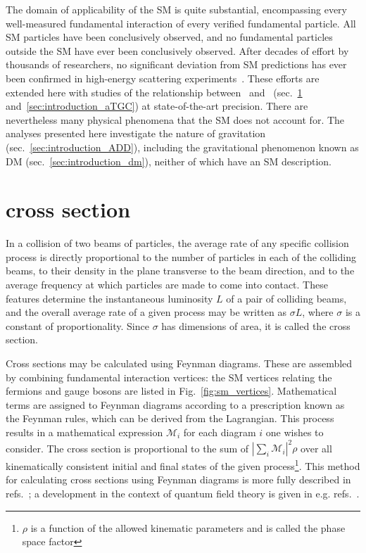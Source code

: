 \documentclass[oneside, letterpaper, 12pt, oldfontcommands]{memoir}
\begin{document}
The domain of applicability of the SM is quite substantial, encompassing
every well-measured fundamental interaction of every verified fundamental particle. All SM particles have been conclusively observed,
and no fundamental particles outside the SM have ever been conclusively observed. After decades of effort by thousands of researchers,
no significant deviation from SM predictions has ever been confirmed in high-energy scattering experiments~\cite{ref:PDG}.
These efforts are extended here with studies of the relationship between \PZ\ and \Pgamma\ (sec.~\ref{sec:introduction_znng} and~\ref{sec:introduction_aTGC}) at state-of-the-art precision.
There are nevertheless many physical phenomena that the SM does not account for.
The analyses presented here investigate the nature of gravitation (sec.~\ref{sec:introduction_ADD}),
including the gravitational phenomenon known as DM (sec.~\ref{sec:introduction_dm}), neither of which have an SM description.

\section{\texorpdfstring{\zinvg}{Z(νν)γ} cross section} \label{sec:introduction_znng}
In a collision of two beams of particles, the average rate of any specific collision process is directly proportional to the
number of particles in each of the colliding beams, to their density in the plane transverse to the beam direction, and to the average
frequency at which particles are made to come into contact. These features determine the instantaneous luminosity $L$ of a pair
of colliding beams, and the overall average rate of a given process may be written as $\sigma L$, where $\sigma$
is a constant of proportionality. Since $\sigma$ has dimensions of area, it is called the cross section.

Cross sections may be calculated using Feynman diagrams. These are
assembled by combining fundamental interaction vertices: the SM vertices relating the fermions and gauge bosons are listed in Fig.~\ref{fig:sm_vertices}.
Mathematical terms are assigned to Feynman diagrams according to a prescription known as the Feynman rules, which can be derived from the Lagrangian.
This process results in a mathematical expression $\mathcal{M}_{i}$ for each diagram $i$ one wishes to consider. The cross section is proportional to the sum of $|\sum_{i}{\mathcal{M}_{i}}|^{2}\rho$
over all kinematically consistent initial and final states of the given process\footnote{$\rho$ is a function of the allowed kinematic parameters and is called the phase space
factor}. This method for calculating cross sections using Feynman diagrams is more fully described in refs.~\cite{ref:HalzenMartin, ref:BargerPhillips};
a development in the context of quantum field theory is given in e.g. refs.~\cite{ref:PeskinSchroeder, ref:Srednicki, ref:Schwartz}.
\end{document}

